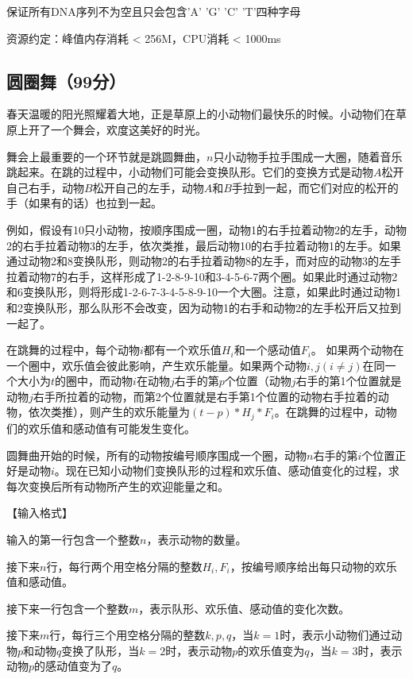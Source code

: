 \documentclass[a4paper, 12pt, twocolumn]{ctexart}
\begin{document}
	保证所有DNA序列不为空且只会包含’A’ ’G’ ’C’ ’T’四种字母
	
	资源约定：峰值内存消耗 < 256M，CPU消耗  < 1000ms
	
	\subsection{圆圈舞（99分）}
	
	春天温暖的阳光照耀着大地，正是草原上的小动物们最快乐的时候。小动物们在草原上开了一个舞会，欢度这美好的时光。
	
	舞会上最重要的一个环节就是跳圆舞曲，$n$只小动物手拉手围成一大圈，随着音乐跳起来。在跳的过程中，小动物们可能会变换队形。它们的变换方式是动物$A$松开自己右手，动物$B$松开自己的左手，动物$A$和$B$手拉到一起，而它们对应的松开的手（如果有的话）也拉到一起。
	
	例如，假设有10只小动物，按顺序围成一圈，动物1的右手拉着动物2的左手，动物2的右手拉着动物3的左手，依次类推，最后动物10的右手拉着动物1的左手。如果通过动物2和8变换队形，则动物2的右手拉着动物8的左手，而对应的动物3的左手拉着动物7的右手，这样形成了1-2-8-9-10和3-4-5-6-7两个圈。如果此时通过动物2和6变换队形，则将形成1-2-6-7-3-4-5-8-9-10一个大圈。注意，如果此时通过动物1和2变换队形，那么队形不会改变，因为动物1的右手和动物2的左手松开后又拉到一起了。
	
	在跳舞的过程中，每个动物$i$都有一个欢乐值$H_i$和一个感动值$F_i$。
	如果两个动物在一个圈中，欢乐值会彼此影响，产生欢乐能量。如果两个动物$i, j(i\neq j)$在同一个大小为$t$的圈中，而动物$i$在动物$j$右手的第$p$个位置（动物$j$右手的第1个位置就是动物$j$右手所拉着的动物，而第2个位置就是右手第1个位置的动物右手拉着的动物，依次类推），则产生的欢乐能量为$(t-p)*H_j*F_i$。在跳舞的过程中，动物们的欢乐值和感动值有可能发生变化。
	
	圆舞曲开始的时候，所有的动物按编号顺序围成一个圈，动物$n$右手的第$i$个位置正好是动物$i$。现在已知小动物们变换队形的过程和欢乐值、感动值变化的过程，求每次变换后所有动物所产生的欢迎能量之和。
	
	【输入格式】
	
	输入的第一行包含一个整数$n$，表示动物的数量。
	
	接下来$n$行，每行两个用空格分隔的整数$H_i, F_i$，按编号顺序给出每只动物的欢乐值和感动值。
	
	接下来一行包含一个整数$m$，表示队形、欢乐值、感动值的变化次数。
	
	接下来$m$行，每行三个用空格分隔的整数$k, p, q$，当$k=1$时，表示小动物们通过动物$p$和动物$q$变换了队形，当$k=2$时，表示动物$p$的欢乐值变为$q$，当$k=3$时，表示动物$p$的感动值变为了$q$。
	
\end{document}
